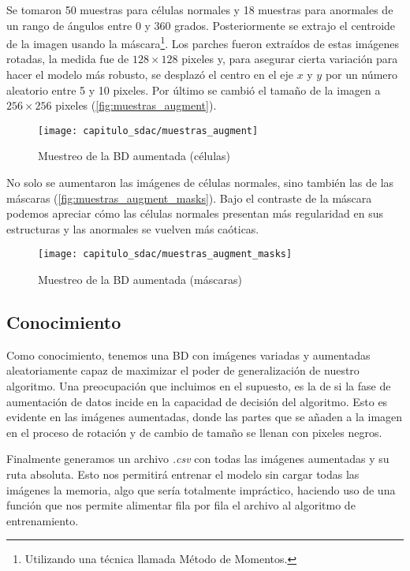 Se tomaron 50 muestras para células normales y 18 muestras para anormales de un
rango de ángulos entre 0 y 360 grados. Posteriormente se extrajo el centroide de
la imagen usando la máscara\footnote{Utilizando una técnica llamada Método de
Momentos.}. Los parches fueron extraídos de estas imágenes rotadas, la medida fue
de \(128 \times 128\) pixeles y, para asegurar cierta variación para hacer el
modelo más robusto, se desplazó el centro en el eje \(x\) y \(y\) por un número
aleatorio entre 5 y 10 pixeles. Por último se cambió el tamaño de la imagen a
\(256 \times 256\) pixeles (\autoref{fig:muestras_augment}). 
  
\begin{figure}[H]
    \centering
    \texttt{[image: capitulo\_sdac/muestras\_augment]}
    \caption{Muestreo de la BD aumentada (células)}\label{fig:muestras_augment}
\end{figure}

No solo se aumentaron las imágenes de células normales, sino también las de las
máscaras (\autoref{fig:muestras_augment_masks}). Bajo el contraste de la máscara
podemos apreciar cómo las células normales presentan más regularidad en sus
estructuras y las anormales se vuelven más caóticas.

\begin{figure}[H]
    \centering
    \texttt{[image: capitulo\_sdac/muestras\_augment\_masks]}
    \caption{Muestreo de la BD aumentada (máscaras)}\label{fig:muestras_augment_masks}
\end{figure}

\subsection{Conocimiento}

Como conocimiento, tenemos una BD con imágenes variadas y aumentadas
aleatoriamente capaz de maximizar el poder de generalización de nuestro
algoritmo. Una preocupación que incluimos en el supuesto, es la de si la fase de
aumentación de datos incide en la capacidad de decisión del algoritmo. Esto es
evidente en las imágenes aumentadas, donde las partes que se añaden a la imagen
en el proceso de rotación y de cambio de tamaño se llenan con pixeles negros. 

Finalmente generamos un archivo \emph{.csv} con todas las imágenes aumentadas y su ruta
absoluta. Esto nos permitirá entrenar el modelo sin cargar todas las imágenes la
memoria, algo que sería totalmente impráctico, haciendo uso de una función que
nos permite alimentar fila por fila el archivo al algoritmo de entrenamiento.
